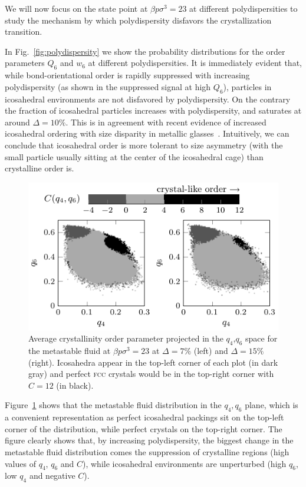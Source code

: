 \documentclass[twocolumn,superscriptaddress]{revtex4}
\begin{document}
We will now focus on the state point at $\beta p\sigma^3=23$ at different polydispersities to
study the mechanism by which polydispersity disfavors the crystallization transition.

In Fig.~\ref{fig:polydispersity} we show the probability distributions for the order
parameters $Q_6$ and $w_6$ at different polydispersities. It is immediately
evident that, while bond-orientational order is rapidly suppressed with increasing
polydispersity (as shown in the suppressed signal at high $Q_6$), particles in icosahedral
environments are not disfavored by polydispersity. On the contrary the fraction of
icosahedral particles increases with polydispersity, and saturates at around $\Delta=10\%$.
This is in agreement with recent evidence of increased icosahedral ordering with size disparity
in metallic glasses~\cite{Shimono2012}. Intuitively, we can conclude that icosahedral order is more tolerant to size
asymmetry (with the small particle usually sitting at the center of the icosahedral cage) than crystalline order is.

\begin{figure}
 \centering
 \includegraphics{fig_Cmaps}
 \caption{Average crystallinity order parameter projected in the $q_4$,$q_6$ space for the metastable fluid at $\beta p\sigma^3=23$ at $\Delta=7\%$ (left) and $\Delta=15\%$ (right). Icosahedra appear in the top-left corner of each plot (in dark gray) and perfect \textsc{fcc} crystals would be in the top-right corner with $C=12$ (in black).}
 \label{fig:Cmaps}
\end{figure}


Figure~\ref{fig:Cmaps} shows that the metastable fluid distribution in the $q_4,q_6$ plane, which is a convenient
representation as perfect icosahedral packings sit on the top-left corner of the distribution, while perfect crystals on
the top-right corner. The figure clearly shows that, by increasing polydispersity, the biggest change in the metastable fluid
distribution comes the suppression of crystalline regions (high values of
$q_4$, $q_6$ and $C$), while icosahedral environments are unperturbed (high $q_6$, low $q_4$ and negative $C$).
\end{document}
